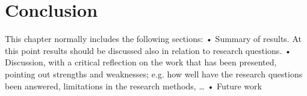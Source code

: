 \chapter{Conclusion}
This chapter normally includes the following sections:
• Summary of results. At this point results should be discussed also in
relation to research questions.
• Discussion, with a critical reflection on the work that has been presented,
pointing out strengths and weaknesses; e.g. how well have the research
questions been answered, limitations in the research methods, …
• Future work